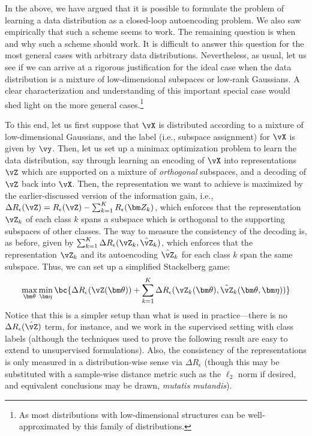 \documentclass[../../book-main.tex]{subfiles}
\begin{document}
In the above, we have argued that it is possible to formulate the problem of learning a data distribution as a closed-loop autoencoding problem. We also saw empirically that such a scheme seems to work. The remaining question is when and why such a scheme should work. It is difficult to answer this question for the most general cases with arbitrary data distributions. Nevertheless, as usual, let us see if we can arrive at a rigorous justification for the ideal case when the data distribution is a mixture of low-dimensional subspaces or low-rank Gaussians. A clear characterization and understanding of this important special case would shed light on the more general cases.\footnote{As most distributions with low-dimensional structures can be well-approximated by this family of distributions.}

To this end, let us first suppose that \(\vX\) is distributed according to a mixture of low-dimensional Gaussians, and the label (i.e., subspace assignment) for \(\vX\) is given by \(\vy\). Then, let us set up a minimax optimization problem to learn the data distribution, say through learning an encoding of \(\vX\) into representations \(\vZ\) which are supported on a mixture of \textit{orthogonal} subspaces, and a decoding of \(\vZ\) back into \(\vX\). Then, the representation we want to achieve is maximized by the earlier-discussed version of the information gain, i.e., \( \Delta R_{\epsilon}(\vZ) = R_{\epsilon}(\vZ) - \sum_{k=1}^K R_{\epsilon}(\bm Z_k) \), which enforces that the representation \(\vZ_{k}\) of each class \(k\) spans a subspace which is orthogonal to the supporting subspaces of other classes. The way to measure the consistency of the decoding is, as before, given by \(\sum_{k = 1}^{K}\Delta R_\epsilon(\vZ_{k}, \hat{\vZ}_{k})\), which enforces that the representation \(\vZ_{k}\) and its autoencoding \(\hat{\vZ}_{k}\) for each class \(k\) span the same subspace. Thus, we can set up a simplified Stackelberg game:
\begin{equation}\label{eq:ctrl_msp_game}
    \max_{\bm \theta}\min_{\bm \eta}\bc{\Delta R_\epsilon(\vZ(\bm \theta)) + \sum_{k = 1}^{K}\Delta R_\epsilon(\vZ_{k}(\bm \theta), \hat{\vZ}_{k}(\bm \theta, \bm \eta))}
\end{equation}
Notice that this is a simpler setup than what is used in practice---there is no \(\Delta R_\epsilon(\hat{\vZ})\) term, for instance, and we work in the supervised setting with class labels (although the techniques used to prove the following result are easy to extend to unsupervised formulations). Also, the consistency of the representations is only measured in a distribution-wise sense via \(\Delta R_\epsilon\) (though this may be substituted with a sample-wise distance metric such as the \(\ell_{2}\) norm if desired, and equivalent conclusions may be drawn, \textit{mutatis mutandis}).
\end{document}
